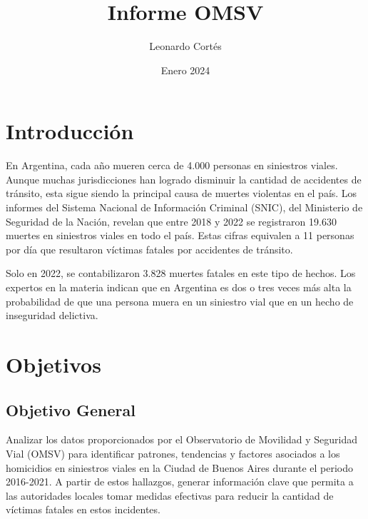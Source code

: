 \documentclass[12pt]{article}
\title{Informe OMSV}
\author{Leonardo Cortés}
\date{Enero 2024}
\begin{document}
\maketitle

\section{Introducción}
En Argentina, cada año mueren cerca de 4.000 personas en siniestros viales. Aunque muchas jurisdicciones han logrado disminuir la cantidad de accidentes de tránsito, esta sigue siendo la principal causa de muertes violentas en el país. Los informes del Sistema Nacional de Información Criminal (SNIC), del Ministerio de Seguridad de la Nación, revelan que entre 2018 y 2022 se registraron 19.630 muertes en siniestros viales en todo el país. Estas cifras equivalen a 11 personas por día que resultaron víctimas fatales por accidentes de tránsito.

Solo en 2022, se contabilizaron 3.828 muertes fatales en este tipo de hechos. Los expertos en la materia indican que en Argentina es dos o tres veces más alta la probabilidad de que una persona muera en un siniestro vial que en un hecho de inseguridad delictiva.

\section{Objetivos}
\subsection{Objetivo General}

Analizar los datos proporcionados por el Observatorio de Movilidad y Seguridad Vial (OMSV) para identificar patrones, tendencias y factores asociados a los homicidios en siniestros viales en la Ciudad de Buenos Aires durante el periodo 2016-2021. A partir de estos hallazgos, generar información clave que permita a las autoridades locales tomar medidas efectivas para reducir la cantidad de víctimas fatales en estos incidentes.
\end{document}
